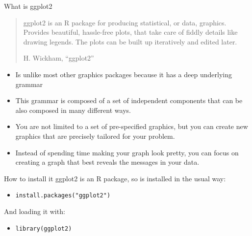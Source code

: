 \documentclass{beamer}\usepackage[]{graphicx}\usepackage[]{color}
\begin{document}
\begin{frame}{What is ggplot2}
\begin{block}{}
\begin{quotation}
ggplot2 is an R package for producing statistical, or data, graphics. Provides beautiful, hassle-free plots, that take care of
fiddly details like drawing legends. The plots can be built up iteratively and edited later.
\begin{flushright}
H. Wickham, ``ggplot2''
\end{flushright}

\end{quotation}
\end{block} \pause
  \begin{itemize}
  \item
  Is unlike most other graphics packages because it has a deep underlying
grammar
\pause
  \item
   This grammar is composed of a set of independent components that can be also composed in many different ways. \pause
  \item
   You are not limited to a set of pre-specified graphics, but you can create new graphics that are precisely tailored for your problem. \pause
  \item	
	 Instead of spending time making your graph look
pretty, you can focus on creating a graph that best reveals the messages in
your data.

  \end{itemize}

\end{frame}

\begin{frame}{How to install it}
ggplot2 is an R package, so is installed in the usual way:
\begin{itemize}
\item \texttt{install.packages("ggplot2")}
\end{itemize}
And loading it with:
\begin{itemize}
\item \texttt{library(ggplot2)}
\end{itemize}
\end{frame}
\end{document}
